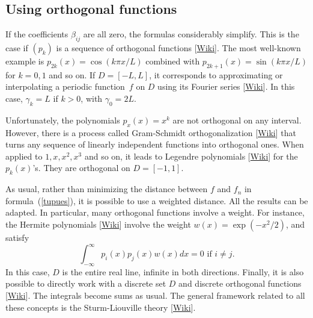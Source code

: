 \documentclass[oneside,10pt]{book}
\begin{document}
\subsection{Using orthogonal functions}\label{poreese}

If the coefficients $\beta_{ij}$ are all zero, the formulas considerably simplify. This is the case if $(p_k)$ is
 a sequence of \textcolor{index}{orthogonal functions} [\href{https://en.wikipedia.org/wiki/Orthogonal_functions}{Wiki}].   The most well-known example is $p_{2k}(x) = \cos(k\pi x/L)$ combined
 with $p_{2k+1}(x) = \sin(k\pi x/L)$ for $k=0,1$ and so on. If $D=[-L,L]$, it corresponds to approximating or interpolating a periodic function~$f$ on $D$ using its  \textcolor{index}{Fourier series} [\href{https://en.wikipedia.org/wiki/Fourier_series}{Wiki}]. In this case, $\gamma_k = L$ if $k>0$, with $\gamma_0=2L$.

Unfortunately, the polynomials $p_x(x) = x^k$ are not orthogonal on any interval.  However, there is a process called 
\textcolor{index}{Gram-Schmidt orthogonalization} 
[\href{https://en.wikipedia.org/wiki/Gram\%E2\%80\%93Schmidt_process}{Wiki}]
 that turns any sequence of linearly independent functions into orthogonal ones. When applied to $1, x, x^2, x^3$ and so on, it leads to 
\textcolor{index}{Legendre polynomials} [\href{https://en.wikipedia.org/wiki/Legendre_polynomials}{Wiki}] for the $p_k(x)$'s. They are orthogonal on $D = [-1, 1]$.

As usual, rather than minimizing the distance between $f$ and $f_n$ in formula~(\ref{tupues}), it is possible to use a weighted distance. All the results can be adapted. In particular, many orthogonal functions involve a weight. For instance, 
the \textcolor{index}{Hermite polynomials} [\href{https://en.wikipedia.org/wiki/Hermite_polynomials}{Wiki}] involve the weight $w(x)=\exp(-x^2/2)$, and satisfy
$$
\int_{-\infty}^\infty p_i(x)p_j(x)w(x) dx = 0 \text { if } i\neq j.
 $$
In this case, $D$ is the entire real line, infinite in both directions. Finally, it is also possible to directly work with a discrete set $D$
 and 
\textcolor{index}{discrete orthogonal functions} [\href{https://en.wikipedia.org/wiki/Discrete_orthogonal_polynomials}{Wiki}]. 
The integrals become sums as usual. The general framework related to all these concepts
 is the \textcolor{index}{Sturm-Liouville theory} [\href{https://en.wikipedia.org/wiki/Sturm\%E2\%80\%93Liouville_theory}{Wiki}].
\end{document}
